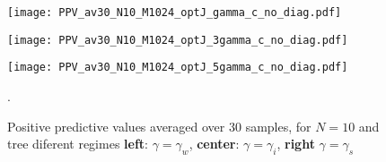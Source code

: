 \documentclass[reprint,amsmath,amssymb,superscriptaddress,showpacs,pre]{revtex4-1}
\begin{document}
\begin{figure*}[!htb]
	\begin{minipage}[b]{0.325\textwidth}
		\begin{center}
			\texttt{[image: PPV\_av30\_N10\_M1024\_optJ\_gamma\_c\_no\_diag.pdf]}
		\end{center}
	\end{minipage}
	\begin{minipage}[b]{0.325\textwidth}
		\begin{center}
			\texttt{[image: PPV\_av30\_N10\_M1024\_optJ\_3gamma\_c\_no\_diag.pdf]}
		\end{center}
	\end{minipage}
	\begin{minipage}[b]{0.325\textwidth}
		\begin{center}
			\texttt{[image: PPV\_av30\_N10\_M1024\_optJ\_5gamma\_c\_no\_diag.pdf]}
		\end{center}
	\end{minipage}
	
	\vspace{-1mm}
	\caption{{  Positive predictive values averaged over 30 samples,  for $N=10$ and tree diferent regimes \textbf{left}: $\gamma=\gamma_w$, \textbf{center}: $\gamma=\gamma_i$, \textbf{right} $\gamma=\gamma_s$  }} .
	\label{PPV_n10}
\end{figure*}
\end{document}
